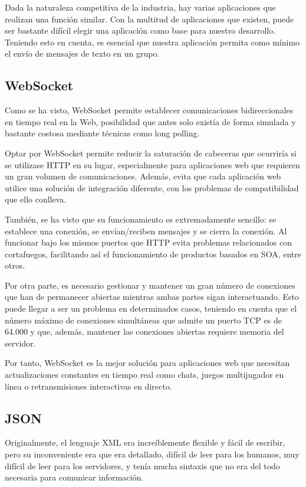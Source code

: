 Dada la naturaleza competitiva de la industria, hay varias aplicaciones que realizan una función similar. Con la multitud de aplicaciones que existen, puede ser bastante difícil elegir una aplicación como base para nuestro desarrollo. Teniendo esto en cuenta, es esencial que nuestra aplicación permita como mínimo el envío de mensajes de texto en un grupo.

\subsection{WebSocket}

Como se ha visto, WebSocket permite establecer comunicaciones bidireccionales en tiempo real en la Web, posibilidad que antes solo existía de forma simulada y bastante costosa mediante técnicas como long polling.

Optar por WebSocket permite reducir la saturación de cabeceras que ocurriría si se utilizase HTTP en su lugar, especialmente para aplicaciones web que requieren un gran volumen de comunicaciones. Además, evita que cada aplicación web utilice una solución de integración diferente, con los problemas de compatibilidad que ello conlleva.

También, se ha visto que su funcionamiento es extremadamente sencillo: se establece una conexión, se envían/reciben mensajes y se cierra la conexión. Al funcionar bajo los mismos puertos que HTTP evita problemas relacionados con cortafuegos, facilitando así el funcionamiento de productos basados en SOA, entre otros.

Por otra parte, es necesario gestionar y mantener un gran número de conexiones que han de permanecer abiertas mientras ambas partes sigan interactuando. Esto puede llegar a ser un problema en determinados casos, teniendo en cuenta que el número máximo de conexiones simultáneas que admite un puerto TCP es de 64.000 y que, además, mantener las conexiones abiertas requiere memoria del servidor.

Por tanto, WebSocket es la mejor solución para aplicaciones web que necesitan actualizaciones constantes en tiempo real como chats, juegos multijugador en línea o retransmisiones interactivas en directo.

\subsection{JSON}

Originalmente, el lenguaje XML era increíblemente flexible y fácil de escribir, pero su inconveniente era que era detallado, difícil de leer para los humanos, muy difícil de leer para los servidores, y tenía mucha sintaxis que no era del todo necesaria para comunicar información.


